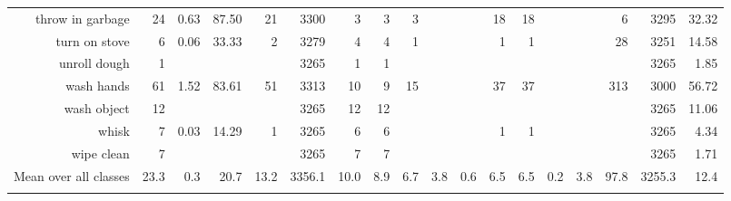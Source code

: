 \begin{tabular}{r r r@{\ \ }r@{\ \ }r@{\ \ }r@{\ \ }r r@{\ \ }r@{\ \ }r@{\ \ }r@{\ \ }r@{\ \ }r@{\ \ }r@{\ \ }r@{\ \ }r@{\ \ }r r}
throw in garbage & 24 & 0.63 & 87.50 & 21 & 3300 & 3 & 3 & 3 &  &  & 18 & 18 &  &  & 6 & 3295 & 32.32 \\
turn on stove & 6 & 0.06 & 33.33 & 2 & 3279 & 4 & 4 & 1 &  &  & 1 & 1 &  &  & 28 & 3251 & 14.58 \\
unroll dough & 1 &  &  &  & 3265 & 1 & 1 &  &  &  &  &  &  &  &  & 3265 & 1.85 \\
wash hands & 61 & 1.52 & 83.61 & 51 & 3313 & 10 & 9 & 15 &  &  & 37 & 37 &  &  & 313 & 3000 & 56.72 \\
wash object & 12 &  &  &  & 3265 & 12 & 12 &  &  &  &  &  &  &  &  & 3265 & 11.06 \\
whisk & 7 & 0.03 & 14.29 & 1 & 3265 & 6 & 6 &  &  &  & 1 & 1 &  &  &  & 3265 & 4.34 \\
wipe clean & 7 &  &  &  & 3265 & 7 & 7 &  &  &  &  &  &  &  &  & 3265 & 1.71 \\
\cmidrule(lr){1-1} \cmidrule(lr){2-2} \cmidrule(lr){3-7} \cmidrule(lr){8-17} \cmidrule(lr){18-18}
Mean over all classes&23.3&0.3&20.7&13.2&3356.1&10.0&8.9&6.7&3.8&0.6&6.5&6.5&0.2&3.8&97.8&3255.3&12.4
\\ \bottomrule \\ \end{tabular}
